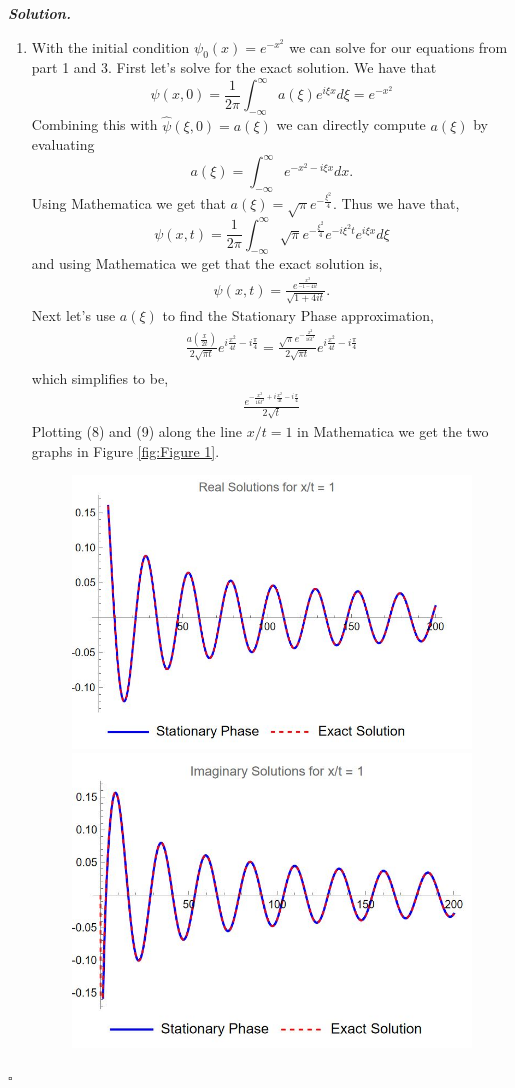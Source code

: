 \documentclass[12pt]{report}
\newenvironment{solution}[1][\it{Solution}]{\textbf{#1. } }{$\square$}
\begin{document}
\begin{solution}
\begin{enumerate}
        \item With the initial condition $\psi_0(x) = e^{-x^2}$ we can solve for our equations from part 1 and 3. First let's solve for the exact solution. We have that
        \[
            \psi(x,0) = \frac{1}{2\pi}\int_{-\infty}^{\infty} a(\xi) e^{i\xi x}d\xi = e^{-x^2}
        \]  
        Combining this with $\hat{\psi}(\xi,0) = a(\xi)$ we can directly compute $a(\xi)$ by evaluating
        \[ a(\xi) = \int_{-\infty}^{\infty}e^{-x^2 - i\xi x}dx. \]
        Using Mathematica we get that $a(\xi) = \sqrt{\pi} e^{-\frac{\xi^2}{4}}$. Thus we have that,
        \[
            \psi(x,t) = \frac{1}{2\pi}\int_{-\infty}^{\infty} \sqrt{\pi} e^{-\frac{\xi^2}{4}} e^{-i\xi^2 t}e^{i\xi x} d\xi
        \] 
        and using Mathematica we get that the exact solution is,
        \begin{align}
            \psi(x,t) = \frac{e^{\frac{x^2}{-1-4it}}}{\sqrt{1 + 4it}}.
        \end{align}
        Next let's use $a(\xi)$ to find the Stationary Phase approximation,
        \begin{align*}
            \frac{a\left( \frac{x}{2t}\right)}{2\sqrt{\pi t}}e^{i \frac{x^2}{4t} - i \frac{\pi}{4}} = \frac{\sqrt{\pi}e^{-\frac{x^2}{16t^2}}}{2\sqrt{\pi t}}e^{i\frac{x^2}{4t} - i\frac{\pi}{4}}\\
        \end{align*}
        which simplifies to be,
        \begin{align}
            \frac{e^{-\frac{x^2}{16t^2} + i \frac{x^2}{4t} - i \frac{\pi}{4}}}{2\sqrt{t}}
        \end{align}
        Plotting (8) and (9) along the line $x/t = 1$ in Mathematica we get the two graphs in Figure \ref{fig:Figure 1}.
        \begin{figure}%
            \centering
            \includegraphics[width=.4\textwidth]{plots/realx1.JPG}
            \qquad
            \includegraphics[width=.4\textwidth]{plots/fakex1.JPG}

\end{figure}
\end{enumerate}
\end{solution}
\end{document}
